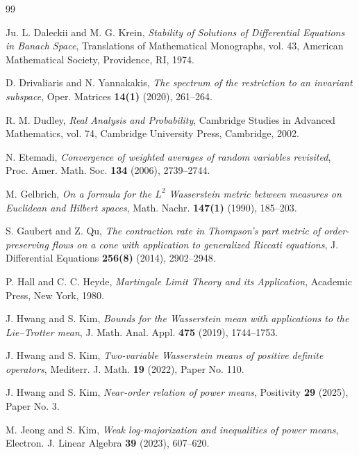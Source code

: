 \documentclass[12pt,reqno]{amsart}
\begin{document}
\begin{thebibliography}{99}

Ju. L. Daleckii and M. G. Krein, \emph{Stability of Solutions of Differential Equations in Banach Space}, Translations of Mathematical Monographs, vol. 43, American Mathematical Society, Providence, RI, 1974.

D. Drivaliaris and N. Yannakakis, \emph{The spectrum of the restriction to an invariant subspace}, Oper. Matrices \textbf{14(1)} (2020), 261--264.

R. M. Dudley, \emph{Real Analysis and Probability}, Cambridge Studies in Advanced Mathematics, vol. 74, Cambridge University Press, Cambridge, 2002.

N. Etemadi, \emph{Convergence of weighted averages of random variables revisited}, Proc. Amer. Math. Soc. \textbf{134} (2006), 2739--2744.


M. Gelbrich, \emph{On a formula for the $L^2$ Wasserstein metric between measures on Euclidean and Hilbert spaces}, Math. Nachr. \textbf{147(1)} (1990), 185--203.

S. Gaubert and Z. Qu, \emph{The contraction rate in Thompson's part metric of order-preserving flows on a cone with application to generalized Riccati equations}, J. Differential Equations \textbf{256(8)} (2014), 2902--2948.

P. Hall and C. C. Heyde, \emph{Martingale Limit Theory and its Application}, Academic Press, New York, 1980.

J. Hwang and S. Kim, \emph{Bounds for the Wasserstein mean with applications to the Lie--Trotter mean}, J. Math. Anal. Appl. \textbf{475} (2019), 1744--1753.

J. Hwang and S. Kim, \emph{Two-variable Wasserstein means of positive definite operators}, Mediterr. J. Math. \textbf{19} (2022), Paper No. 110.

J. Hwang and S. Kim, \emph{Near-order relation of power means}, Positivity \textbf{29} (2025), Paper No. 3.

M. Jeong and S. Kim, \emph{Weak log-majorization and inequalities of power means}, Electron. J. Linear Algebra \textbf{39} (2023), 607--620.


\end{thebibliography}
\end{document}
